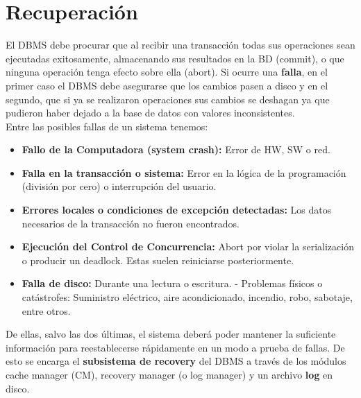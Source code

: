 \section*{Recuperación}
El DBMS debe procurar que al recibir una transacción todas sus operaciones sean ejecutadas exitosamente, almacenando sus resultados en la BD (commit), o que ninguna operación tenga efecto sobre ella (abort). Si ocurre una \textbf{falla}, en el primer caso el DBMS debe asegurarse que los cambios pasen a disco y en el segundo, que si ya se realizaron operaciones sus cambios se deshagan ya que pudieron haber dejado a la base de datos con valores inconsistentes. \\
Entre las posibles fallas de un sistema tenemos:
\begin{itemize}
    \item \textbf{Fallo de la Computadora (system crash):} Error de HW, SW o red.
    \item \textbf{Falla en la transacción o sistema:} Error en la lógica de la programación (división por cero) o interrupción del usuario.
    \item \textbf{Errores locales o condiciones de excepción detectadas:} Los datos necesarios de la transacción no fueron encontrados.
    \item \textbf{Ejecución del Control de Concurrencia:} Abort por violar la serialización o producir un deadlock. Estas suelen reiniciarse posteriormente.
    \item \textbf{Falla de disco:} Durante una lectura o escritura.
- Problemas físicos o catástrofes: Suministro eléctrico, aire acondicionado, incendio, robo, sabotaje, entre otros.
\end{itemize}
De ellas, salvo las dos últimas, el sistema deberá poder mantener la suficiente información para reestablecerse rápidamente en un modo a prueba de fallas. De esto se encarga el \textbf{subsistema de recovery} del DBMS a través de los módulos cache manager (CM), recovery manager (o log manager) y un archivo \textbf{log} en disco.

